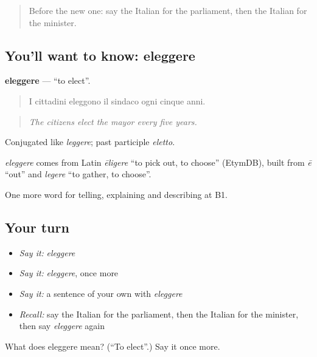 \begin{quote}
Before the new one: say the Italian for the parliament, then the Italian for the minister.
\end{quote}

\subsection*{You'll want to know: eleggere}
\textbf{eleggere} — \textquotedblleft{}to elect\textquotedblright{}.

\begin{quote}
I cittadini eleggono il sindaco ogni cinque anni.
\end{quote}

\begin{quote}
\emph{The citizens elect the mayor every five years.}
\end{quote}

Conjugated like \emph{leggere}; past participle \emph{eletto}.

\begin{cousinweb}
\emph{eleggere} comes from Latin \emph{ēligere} \textquotedblleft{}to pick out, to choose\textquotedblright{} (EtymDB), built from \emph{ē} \textquotedblleft{}out\textquotedblright{} and \emph{legere} \textquotedblleft{}to gather, to choose\textquotedblright{}.
\end{cousinweb}

\begin{grammarlens}[title={What you've built}]
One more word for telling, explaining and describing at B1.
\end{grammarlens}

\subsection*{Your turn}
\begin{itemize}
\raggedright
  \item \emph{Say it:} \emph{eleggere}
  \item \emph{Say it:} \emph{eleggere}, once more
  \item \emph{Say it:} a sentence of your own with \emph{eleggere}
  \item \emph{Recall:} say the Italian for the parliament, then the Italian for the minister, then say \emph{eleggere} again
\end{itemize}

\begin{tcolorbox}[breakable,colback=teal!4,colframe=teal!35!black,title={Before you move on}]
What does eleggere mean? (\textquotedblleft{}To elect\textquotedblright{}.) Say it once more.
\end{tcolorbox}
